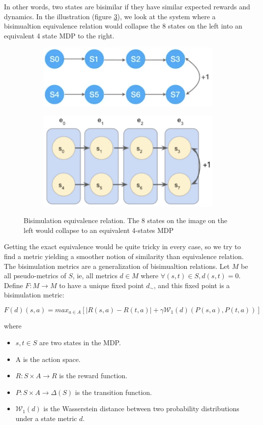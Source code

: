 \documentclass{usiinftr}
\begin{document}
In other words, two states are bisimilar if they have similar expected rewards and dynamics. In the illustration (figure \ref{fig:BisimulationEquivalence}), we look at the system where a bisimualtion equivalence relation would collapse the 8 states on the left into an equivalent 4 state MDP to the right.

\begin{figure}[h]
    \centering
    \begin{subfigure}
        \centering
        \includegraphics[width = 0.4\linewidth]{figures/image4.png}
        \label{}
    \end{subfigure}%
    \begin{subfigure}
        \centering
        \includegraphics[width = 0.4\linewidth]{figures/image5.png}
        \label{}
    \end{subfigure}
    \caption{Bisimulation equivalence relation. The 8 states on the image on the left would collapse to an equivalent 4-states MDP \cite{pscsWebsite}}
    \label{fig:BisimulationEquivalence}
\end{figure}

Getting the exact equivalence would be quite tricky in every case, so we try to find a metric yielding a smoother notion of similarity than equivalence relation. The bisimulation metrics are a generalization of bisimualtion relations. Let $M$ be all pseudo-metrics of $S$, ie, all metrics $d \in M $ where $\forall (s,t) \in S, d(s,t)=0$. Define $F: M \rightarrow M$ to have a unique fixed point $d_{\sim}$, and this fixed point is a bisimulation metric:

\begin{equation}
    F(d)(s,a) = max_{a \in A} [|R(s,a) - R(t,a)| + \gamma \mathcal{W}_1 (d)(P(s,a),P(t,a))]
\end{equation}

where 
\begin{itemize}
    \item $s,t \in S$ are two states in the MDP.
    \item A is the action space.
    \item $R:S \times A \rightarrow R$ is the reward function.
    \item $P:S \times A \rightarrow \Delta(S)$ is the transition function.
    \item $\mathcal{W}_1 (d)$ is the Wasserstein distance between two probability distributions under a state metric $d$.
\end{itemize}
\cite{castro2020scalable}
\end{document}
